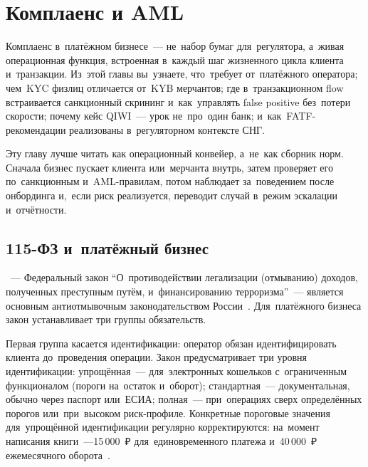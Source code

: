 \chapter{Комплаенс и AML}
\label{ch:compliance-aml}

\begin{kaobox}[title=Что вы узнаете из этой главы]
  Комплаенс в~платёжном бизнесе~--- не~набор бумаг для~регулятора, а~живая
  операционная функция, встроенная в~каждый шаг жизненного цикла клиента
  и~транзакции. Из~этой главы вы~узнаете, что~требует  от~платёжного
  оператора; чем~KYC физлиц отличается от~KYB мерчантов; где в~транзакционном
  flow встраивается санкционный скрининг и~как~управлять false positive
  без~потери скорости; почему кейс QIWI~--- урок не~про~один банк; и~как~FATF-рекомендации
  реализованы в~регуляторном контексте СНГ.
\end{kaobox}

Эту главу лучше читать как операционный конвейер, а~не~как
сборник норм. Сначала бизнес пускает клиента или~мерчанта
внутрь, затем проверяет его по~санкционным и~AML-правилам,
потом наблюдает за~поведением после онбординга и,~если риск
реализуется, переводит случай в~режим эскалации и~отчётности.


\section{115-ФЗ и~платёжный бизнес}
\label{sec:compliance-115fz}

~--- Федеральный закон \enquote{О~противодействии легализации
  (отмыванию) доходов, полученных преступным путём, и~финансированию терроризма}~---
является основным антиотмывочным законодательством России~.
Для~платёжного бизнеса закон устанавливает три группы обязательств.

Первая группа касается идентификации: оператор обязан идентифицировать
клиента до~проведения операции. Закон предусматривает три уровня
идентификации: упрощённая~--- для~электронных кошельков с~ограниченным
функционалом (пороги на~остаток и~оборот); стандартная~--- документальная,
обычно через паспорт или~ЕСИА; полная~--- при~операциях сверх определённых
порогов или~при~высоком риск-профиле. Конкретные пороговые значения
для~упрощённой идентификации регулярно корректируются: на~момент написания
книги~---15\,000~₽ для~единовременного платежа и~40\,000~₽ ежемесячного
оборота~.


